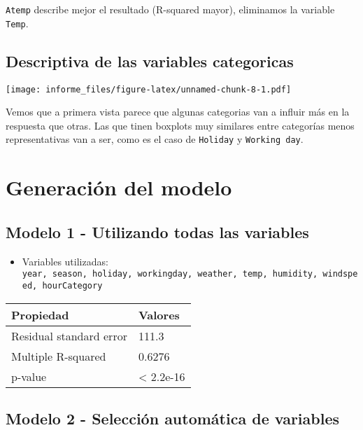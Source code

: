 \documentclass[
]{article}
\providecommand{\tightlist}{%
  \setlength{\itemsep}{0pt}\setlength{\parskip}{0pt}}
\begin{document}
\texttt{Atemp} describe mejor el resultado (R-squared mayor), eliminamos
la variable \texttt{Temp}.

\hypertarget{descriptiva-de-las-variables-categoricas}{%
\subsection{Descriptiva de las variables
categoricas}\label{descriptiva-de-las-variables-categoricas}}

\texttt{[image: informe\_files/figure-latex/unnamed-chunk-8-1.pdf]}

Vemos que a primera vista parece que algunas categorias van a influir
más en la respuesta que otras. Las que tinen boxplots muy similares
entre categorías menos representativas van a ser, como es el caso de
\texttt{Holiday} y \texttt{Working\ day}.

\hypertarget{generaciuxf3n-del-modelo}{%
\section{Generación del modelo}\label{generaciuxf3n-del-modelo}}

\hypertarget{modelo-1---utilizando-todas-las-variables}{%
\subsection{Modelo 1 - Utilizando todas las
variables}\label{modelo-1---utilizando-todas-las-variables}}

\begin{itemize}
\tightlist
\item
  Variables utilizadas:
  \texttt{year,\ season,\ holiday,\ workingday,\ weather,\ temp,\ humidity,\ windspeed,\ hourCategory}
\end{itemize}

\begin{longtable}[]{@{}ll@{}}
\toprule
Propiedad & Valores\tabularnewline
\midrule
\endhead
Residual standard error & 111.3\tabularnewline
Multiple R-squared & 0.6276\tabularnewline
p-value & \textless{} 2.2e-16\tabularnewline
\bottomrule
\end{longtable}

\hypertarget{modelo-2---selecciuxf3n-automuxe1tica-de-variables}{%
\subsection{Modelo 2 - Selección automática de
variables}\label{modelo-2---selecciuxf3n-automuxe1tica-de-variables}}
\end{document}
